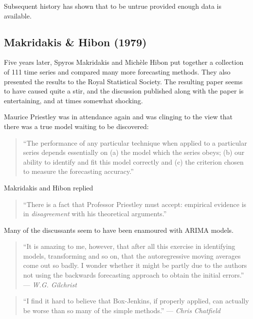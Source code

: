 \documentclass[11pt,a4paper,]{article}
\begin{document}
Subsequent history has shown that to be untrue provided enough data is available.

\hypertarget{makridakis-hibon-1979}{%
\subsection*{Makridakis \& Hibon (1979)}\label{makridakis-hibon-1979}}

Five years later, Spyros Makridakis and Michèle Hibon put together a collection of 111 time series and compared many more forecasting methods. They also presented the results to the Royal Statistical Society. The resulting paper \autocite{Makridakis1979} seems to have caused quite a stir, and the discussion published along with the paper is entertaining, and at times somewhat shocking.

Maurice Priestley was in attendance again and was clinging to the view that there was a true model waiting to be discovered:

\begin{quote}
``The performance of any particular technique when applied to a particular series depends essentially on (a) the model which the series obeys; (b) our ability to identify and fit this model correctly and (c) the criterion chosen to measure the forecasting accuracy.''
\end{quote}

Makridakis and Hibon replied

\begin{quote}
``There is a fact that Professor Priestley must accept: empirical evidence is in \emph{disagreement} with his theoretical arguments.''
\end{quote}

Many of the discussants seem to have been enamoured with ARIMA models.

\begin{quote}
``It is amazing to me, however, that after all this exercise in identifying models, transforming and so on, that the autoregressive moving averages come out so badly. I wonder whether it might be partly due to the authors not using the backwards forecasting approach to obtain the initial errors.'' --- \emph{W.G. Gilchrist}
\end{quote}

\begin{quote}
``I find it hard to believe that Box-Jenkins, if properly applied, can actually be worse than so many of the simple methods.'' --- \emph{Chris Chatfield}
\end{quote}
\end{document}
